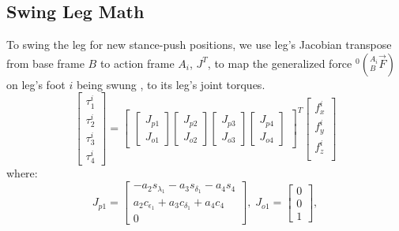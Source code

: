\documentclass[]{article}
\begin{document}
\subsection{Swing Leg Math} 
To swing the leg for new stance-push positions, we use leg's Jacobian \cite{craig_introduction_2009} transpose  from base frame $B$ to action frame $A_i$, $J^T$, to map the generalized force  $^0(_B^{A_i}\vec{F})$ on leg's foot $i$ being swung , to its leg's joint torques. 
\begin{equation}
	\begin{bmatrix}
		\tau_1^i 	\\
		\tau_2^i	\\
		\tau_3^i	\\
		\tau_4^i	
	\end{bmatrix}
	=
	\begin{bmatrix}
		\begin{bmatrix}
			J_{p1}	\\J_{o1}
		\end{bmatrix}
		\begin{bmatrix}
			J_{p2}	\\J_{o2}	
		\end{bmatrix}
		\begin{bmatrix}
			J_{p3}	\\J_{o3}
		\end{bmatrix}
		\begin{bmatrix}
			J_{p4}	\\J_{o4}
		\end{bmatrix}
	\end{bmatrix}^T	
	\begin{bmatrix}
	f_x^i 	\\
	f_y^i 	\\
	f_z^i	\\
	\end{bmatrix}
\end{equation} 
where:\\
\begin{equation}
J_{p1}=
\begin{bmatrix}
	-a_{{2}}s_{{\lambda_{{1}}}}-a_{{3}}s_{{
		\delta_{{1}}}}-a_{{4}}s_{{4}}\\ 
	a_{{2}}c_{{\epsilon_
		{{1}}}}+a_{{3}}c_{{\delta_{{1}}}}+a_{{4}}c_{{4}}\\ 
	0
\end{bmatrix}, \nonumber
\;J_{o1}=
\begin{bmatrix}
	0\\0\\1
\end{bmatrix}, \nonumber
\end{equation}
\end{document}
